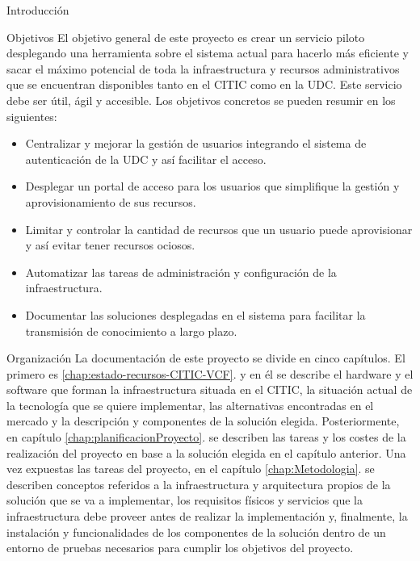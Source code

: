 \begin{chapter}{Introducción}
\begin{section}{Objetivos}
El objetivo general de este proyecto es crear un servicio piloto desplegando una herramienta sobre el sistema actual para hacerlo más eficiente y sacar el máximo potencial de toda la infraestructura y recursos administrativos que se encuentran disponibles tanto en el CITIC como en la UDC. Este servicio debe ser útil, ágil y accesible.
Los objetivos concretos se pueden resumir en los siguientes:
\begin{itemize}
    \item Centralizar y mejorar la gestión de usuarios integrando el sistema de autenticación de la UDC y así facilitar el acceso.
    \item Desplegar un portal de acceso para los usuarios que simplifique la gestión y aprovisionamiento de sus recursos.
    \item Limitar y controlar la cantidad de recursos que un usuario puede aprovisionar y así evitar tener recursos ociosos.
    \item Automatizar las tareas de administración y configuración de la infraestructura.
    \item Documentar las soluciones desplegadas en el sistema para facilitar la transmisión de conocimiento a largo plazo.
\end{itemize}
\end{section}

\begin{section}{Organización}
    La documentación de este proyecto se divide en cinco capítulos. El primero es \ref{chap:estado-recursos-CITIC-VCF}. y en él se describe el hardware y el software que forman la infraestructura situada en el CITIC, la situación actual de la tecnología que se quiere implementar, las alternativas encontradas en el mercado y la descripción y componentes de la solución elegida. Posteriormente, en capítulo \ref{chap:planificacionProyecto}. se describen las tareas y los costes de la realización del proyecto en base a la solución elegida en el capítulo anterior. Una vez expuestas las tareas del proyecto, en el capítulo \ref{chap:Metodologia}. se describen conceptos referidos a la infraestructura y arquitectura propios de la solución que se va a implementar, los requisitos físicos y servicios que la infraestructura debe proveer antes de realizar la implementación y, finalmente, la instalación y funcionalidades de los componentes de la solución dentro de un entorno de pruebas necesarios para cumplir los objetivos del proyecto.
\end{section}

\end{chapter}